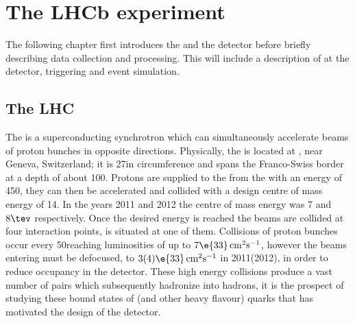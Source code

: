 \chapter{The LHCb experiment}
\label{ch:lhcb}

The following chapter first introduces the \lhc and the \lhcb detector before briefly
describing data collection and processing.
This will include a description of \pid at the \lhcb detector, triggering and event simulation.



\section{The LHC}
The \lhc is a superconducting synchrotron which can simultaneously accelerate beams of proton bunches
in opposite directions.
Physically, the \lhc is located at \cern, near Geneva, Switzerland; it is 27\km in
circumference and spans the Franco-Swiss border at a depth of about 100\m.
Protons are supplied to the \lhc from the \sps with an energy of 450\gev, they can then
be accelerated and collided with a design centre of mass energy of 14\tev.
In the years 2011 and 2012 the centre of mass energy was 7 and $8\tev$ respectively.
Once the desired energy is reached the beams are collided at four interaction points, \lhcb is
situated at one of them.
Collisions of proton bunches occur every 50\ns reaching luminosities of up to
$7\e{33}\,\mathrm{cm}^{2}\mathrm{s}^{-1}$, however the beams entering \lhcb must be defocused, to
$3(4)\e{33}\,\mathrm{cm}^{2}\mathrm{s}^{-1}$ in 2011(2012), in order to reduce occupancy in the
\lhcb detector.
These high energy collisions produce a vast number of \bbbar pairs which subsequently hadronize
into \bquark hadrons, it is the prospect of studying these bound states of \bquark (and other heavy
flavour) quarks that has motivated the design of the \lhcb detector.






\clearpage

